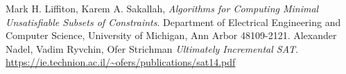 \begin{thebibliography}{9}
Mark H. Liffiton, Karem A. Sakallah,
\textit{Algorithms for Computing Minimal Unsatisfiable Subsets of Constraints}.
Department of Electrical Engineering and Computer Science,
University of Michigan, Ann Arbor 48109-2121.
Alexander Nadel, Vadim Ryvchin, Ofer Strichman
\textit{Ultimately Incremental SAT}.
\url{https://ie.technion.ac.il/~ofers/publications/sat14.pdf}
\end{thebibliography}